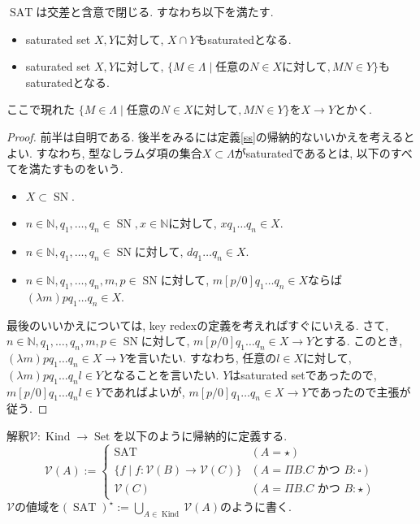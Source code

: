 \documentclass[12pt, titlepage]{ltjsarticle}
\DeclareMathOperator{\SN}{SN}
\DeclareMathOperator{\Kind}{Kind}
\DeclareMathOperator{\SAT}{SAT}
\DeclareMathOperator{\Set}{Set}
\begin{document}
\begin{lem}
 $\SAT$は交差と含意で閉じる. すなわち以下を満たす.
 \begin{itemize}
  \item saturated set $X, Y$に対して, $X \cap Y$もsaturatedとなる.
  \item saturated set $X, Y$に対して, $\{ M \in \Lambda \mid \text{任意の} N \in X \text{に対して}, M N \in Y\}$もsaturatedとなる.
 \end{itemize}
 ここで現れた $\{ M \in \Lambda \mid \text{任意の} N \in X \text{に対して}, M N \in Y\}$を$X \rightarrow Y$とかく.
\end{lem}
\begin{proof}
 前半は自明である.
 後半をみるには定義\ref{ss}の帰納的ないいかえを考えるとよい. すなわち, 
 型なしラムダ項の集合$X \subset \Lambda$がsaturatedであるとは, 以下のすべてを満たすものをいう.
 \begin{itemize}
  \item $X \subset \SN$.
  \item $n \in \mathbb{N}, q_1, \ldots, q_n \in \SN, x \in \mathbb{N}$に対して, $x q_1 \ldots q_n \in X$.
  \item $n \in \mathbb{N}, q_1, \ldots, q_n \in \SN$に対して, $d q_1 \ldots q_n \in X$.
  \item $n \in \mathbb{N}, q_1, \ldots, q_n, m, p \in \SN$に対して, $m[p/0]q_1 \ldots q_n \in X$ならば$(\lambda m)p q_1 \ldots q_n \in X$.
 \end{itemize}
最後のいいかえについては, key redexの定義を考えればすぐにいえる.
さて, $n \in \mathbb{N}, q_1, \ldots, q_n, m, p \in \SN$に対して, $m[p/0]q_1 \ldots q_n \in X \rightarrow Y$とする. このとき, $(\lambda m)p q_1 \ldots q_n \in X \rightarrow Y$を言いたい.
すなわち, 任意の$l \in X$に対して, $(\lambda m)p q_1 \ldots q_n l \in Y$となることを言いたい.
 $Y$はsaturated setであったので, $m[p/0] q_1 \ldots q_n l \in Y$であればよいが, $m[p/0]q_1 \ldots q_n \in X \rightarrow Y$であったので主張が従う.
\end{proof}

\begin{defn}
 解釈$\mathcal{V} : \Kind \rightarrow \Set$を以下のように帰納的に定義する. 
\[
  \mathcal{V} (A) := \begin{cases}
    \SAT & (A = \star) \\
    \{ f \mid f : \mathcal{V}(B) \rightarrow \mathcal{V}(C) \} & (A = \Pi B. C \text{ かつ }B : \square) \\
    \mathcal{V} (C) & (A = \Pi B. C  \text{ かつ }B : \star)
  \end{cases}
\]
 $\mathcal{V}$の値域を$(\SAT)^\star := \bigcup_{A \in \Kind} \mathcal{V}(A)$のように書く.
\end{defn}
\end{document}
